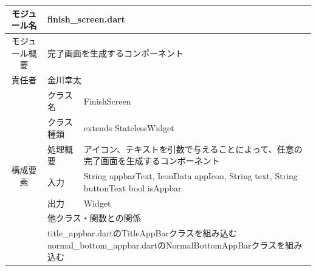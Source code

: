 \begin{table}[H]
  \centering
  \begin{tabular}{|c|l|l|} \hline
    モジュール名                & \multicolumn{2}{l|}{finish\_screen.dart}                                                                                                                   \\ \hline
    モジュール概要               & \multicolumn{2}{p{12cm}|}{完了画面を生成するコンポーネント}                                                                                                                \\ \hline
    責任者                   & \multicolumn{2}{l|}{金川幸太}                                                                                                                                  \\ \hline
    \multirow{7}{*}{構成要素} & クラス名                                        & FinishScreen                                                                                                 \\ \cline{2-3}
                          & クラス種類                                       & extends StatelessWidget                                                                                      \\ \cline{2-3}
                          & 処理概要                                        & \multicolumn{1}{p{12cm}|}{アイコン、テキストを引数で与えることによって、任意の完了画面を生成するコンポーネント}                                        \\ \cline{2-3}
                          & 入力                                          & \multicolumn{1}{p{12cm}|}{String appbarText, IconData appIcon, String text, String buttonText bool isAppbar} \\ \cline{2-3}
                          & 出力                                          & Widget                                                                                                       \\ \cline{2-3}
                          & \multicolumn{2}{l|}{他クラス・関数との関係}                                                                                                                           \\ \cline{2-3}
                          & \multicolumn{2}{p{14cm}|}{
      title\_appbar.dartのTitleAppBarクラスを組み込む
      \newline normal\_bottom\_appbar.dartのNormalBottomAppBarクラスを組み込む
}
\end{tabular}
\end{table}
